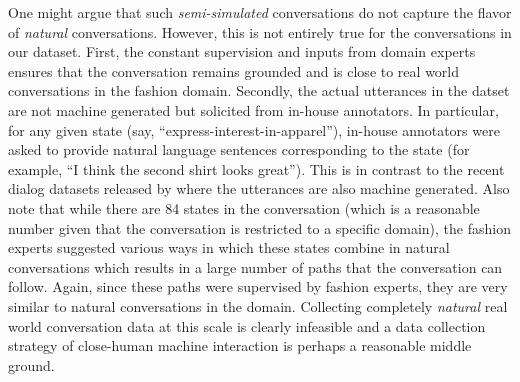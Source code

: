 \documentclass[letterpaper]{article} %
\begin{document}
One might argue that such \textit{semi-simulated} conversations do not capture the flavor of \textit{natural} conversations. However, this is not entirely true for the conversations in our dataset. First, the constant supervision and inputs from domain experts ensures that the conversation remains grounded and is close to real world conversations in the fashion domain. Secondly, the actual utterances in the datset are not machine generated but solicited from in-house annotators. In particular, for any given state (say, ``express-interest-in-apparel''), in-house annotators were asked to provide natural language sentences corresponding to the state (for example, ``I think the second shirt looks great''). This is in contrast to the recent dialog datasets released by  \cite{DBLP:journals/corr/BordesW16} where the utterances are also machine generated. Also note that while there are 84 states in the conversation (which is a reasonable number given that the conversation is restricted to a specific domain), the fashion experts suggested various ways in which these states combine in natural conversations which results in a large number of paths that the conversation can follow. Again, since these paths were supervised by fashion experts, they are very similar to natural conversations in the domain. Collecting completely \textit{natural} real world conversation data at this scale is clearly infeasible and a data collection strategy of close-human machine interaction is perhaps a reasonable middle ground.

\end{document}
